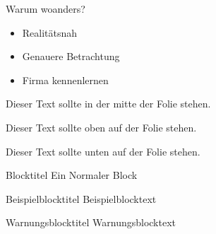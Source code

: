 \begin{frame}{Warum woanders?}
    \begin{itemize}
        \item{Realitätsnah}\pause
        \item{Genauere Betrachtung}\pause%
        \item{Firma kennenlernen}
    \end{itemize}
\end{frame}

\begin{frame}[c]
    Dieser Text sollte in der mitte der Folie stehen.
\end{frame}
\begin{frame}[t]
    Dieser Text sollte oben auf der Folie stehen.
\end{frame}
\begin{frame}[b]
    Dieser Text sollte unten auf der Folie stehen.
\end{frame}

\begin{frame}
    \begin{block}{Blocktitel} 
        Ein Normaler Block
    \end{block}
    \begin{exampleblock}{Beispielblocktitel} 
        Beispielblocktext
    \end{exampleblock}
    \begin{alertblock}{Warnungsblocktitel}
        Warnungsblocktext
    \end{alertblock}
\end{frame}